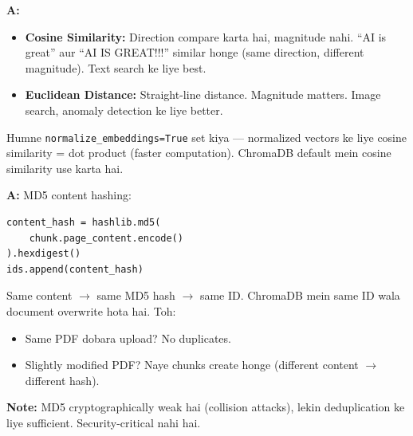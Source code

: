 \documentclass[12pt, a4paper]{article}
\begin{document}
\begin{interviewbox}[title={\faIcon{user-tie} ~Q26: Cosine similarity vs Euclidean distance --- kab kya?}]
\textbf{A:}
\begin{itemize}
\item \textbf{Cosine Similarity:} Direction compare karta hai, magnitude nahi. ``AI is great'' aur ``AI IS GREAT!!!'' similar honge (same direction, different magnitude). Text search ke liye best.
\item \textbf{Euclidean Distance:} Straight-line distance. Magnitude matters. Image search, anomaly detection ke liye better.
\end{itemize}

Humne \texttt{normalize\_embeddings=True} set kiya --- normalized vectors ke liye cosine similarity = dot product (faster computation). ChromaDB default mein cosine similarity use karta hai.
\end{interviewbox}

\begin{interviewbox}[title={\faIcon{user-tie} ~Q27: Duplicate documents kaise handle kiye?}]
\textbf{A:} MD5 content hashing:
\begin{lstlisting}[style=pythonstyle]
content_hash = hashlib.md5(
    chunk.page_content.encode()
).hexdigest()
ids.append(content_hash)
\end{lstlisting}

Same content $\rightarrow$ same MD5 hash $\rightarrow$ same ID. ChromaDB mein same ID wala document overwrite hota hai. Toh:
\begin{itemize}
\item Same PDF dobara upload? No duplicates.
\item Slightly modified PDF? Naye chunks create honge (different content $\rightarrow$ different hash).
\end{itemize}

\textbf{Note:} MD5 cryptographically weak hai (collision attacks), lekin deduplication ke liye sufficient. Security-critical nahi hai.
\end{interviewbox}
\end{document}

